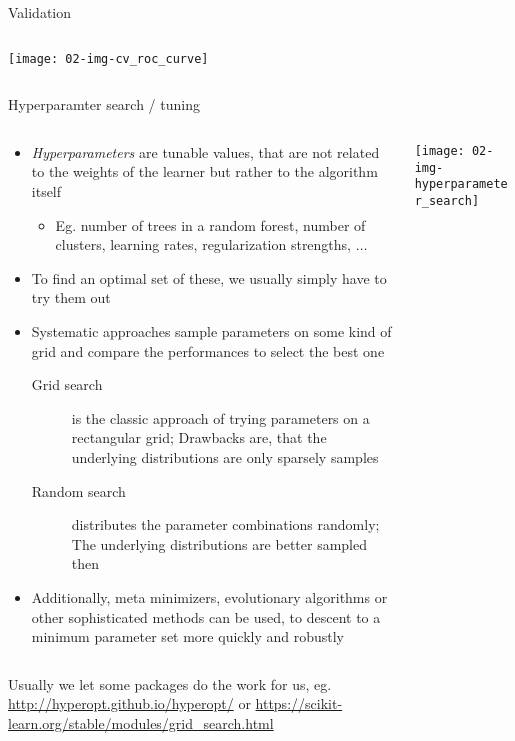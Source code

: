 \begin{frame}{Validation}
\begin{columns}
\begin{column}{0.3\textwidth}
          \vspace{1cm}

          \texttt{[image: 02-img-cv\_roc\_curve]}
        \end{column}
      \end{columns}
    \end{frame}

    \begin{frame}{Hyperparamter search / tuning}
      \enlargethispage{1cm}
      \begin{columns}
        \begin{column}{0.75\textwidth}
          \begin{itemize}
            \item \emph{Hyperparameters} are tunable values, that are not related to the weights of the learner but rather to the algorithm itself
            \begin{itemize}
              \item Eg. number of trees in a random forest, number of clusters, learning rates, regularization strengths, $\dots$
            \end{itemize}
            \item To find an optimal set of these, we usually simply have to try them out
            \item Systematic approaches sample parameters on some kind of grid and compare the performances to select the best one
            \begin{description}
              \item[Grid search] is the classic approach of trying parameters on a rectangular grid; Drawbacks are, that the underlying distributions are only sparsely samples
              \item[Random search] distributes the parameter combinations randomly; The underlying distributions are better sampled then
            \end{description}
            \item Additionally, meta minimizers, evolutionary algorithms or other sophisticated methods can be used, to descent to a minimum parameter set more quickly and robustly
          \end{itemize}
        \end{column}
        \begin{column}{0.25\textwidth}
          \texttt{[image: 02-img-hyperparameter\_search]}
        \end{column}
      \end{columns}
      \footnotesize Usually we let some packages do the work for us, eg. \url{http://hyperopt.github.io/hyperopt/} or \url{https://scikit-learn.org/stable/modules/grid_search.html}
    \end{frame}

